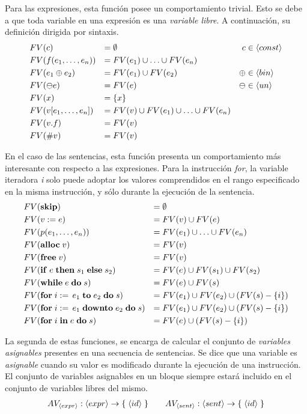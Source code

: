 \documentclass{article}
\begin{document}
Para las expresiones, esta función posee un comportamiento trivial.
Esto se debe a que toda variable en una expresión es una \textit{variable libre}.
A continuación, su definición dirigida por sintaxis.
\begin{align*}
&FV(c)
&=&\;
\emptyset
&c &\in \langle const \rangle
\\
&FV(f(e_1, \ldots, e_n))
&=&\;
FV(e_1) \cup \ldots \cup FV(e_n)
\\
&FV(e_1 \oplus e_2)
&=&\;
FV(e_1) \cup FV(e_2)
&\oplus &\in \langle bin \rangle
\\
&FV(\ominus e)
&=&\;
FV(e)
&\ominus &\in \langle un \rangle
\\
&FV(x)
&=&\;
\{ x \}
\\
&FV(v [e_1, \ldots, e_n])
&=&\;
FV(v) \cup FV(e_1) \cup \ldots \cup FV(e_n)
\\
&FV(v.f)
&=&\;
FV(v)
\\
&FV(\# v)
&=&\;
FV(v)
\end{align*}

En el caso de las sentencias, esta función presenta un comportamiento más interesante con respecto a las expresiones.
Para la instrucción \textit{for}, la variable iteradora \textit{i} solo puede adoptar los valores comprendidos en el rango especificado en la misma instrucción, y sólo durante la ejecución de la sentencia.
\begin{align*}
&FV(\mathbf{skip})
&=&\;
\emptyset
\\
&FV(v := e)
&=&\;
FV(v) \cup FV(e)
\\
&FV(p(e_1, \ldots, e_n))
&=&\;
FV(e_1) \cup \ldots \cup FV(e_n)
\\
&FV(\mathbf{alloc} \; v)
&=&\;
FV(v)
\\
&FV(\mathbf{free} \; v)
&=&\;
FV(v)
\\
&FV(\mathbf{if} \; e \; \mathbf{then} \; s_1 \; \mathbf{else} \; s_2)
&=&\;
FV(e) \cup FV(s_1) \cup FV(s_2)
\\
&FV(\mathbf{while} \; e \; \mathbf{do} \; s)
&=&\;
FV(e) \cup FV(s)
\\
&FV(\mathbf{for} \; i := \, e_1 \; \mathbf{to} \; e_2 \; \mathbf{do} \; s)
&=&\;
FV(e_1) \cup FV(e_2) \cup (FV(s) - \{ i \})
\\
&FV(\mathbf{for} \; i := \, e_1 \; \mathbf{downto} \; e_2 \; \mathbf{do} \; s)
&=&\;
FV(e_1) \cup FV(e_2) \cup (FV(s) - \{ i \})
\\
&FV(\mathbf{for} \; i \; \mathbf{in} \; e \; \mathbf{do} \; s)
&=&\;
FV(e) \cup (FV(s) - \{ i \})
\end{align*}

La segunda de estas funciones, se encarga de calcular el conjunto de \textit{variables asignables} presentes en una secuencia de sentencias.
Se dice que una variable es \textit{asignable} cuando su valor es modificado durante la ejecución de una instrucción.
El conjunto de variables asignables en un bloque siempre estará incluido en el conjunto de variables libres del mismo.
\begin{gather*}
AV_{\langle expr \rangle}: \langle expr \rangle \rightarrow \{ \; \langle id \rangle \; \}
\qquad
AV_{\langle sent \rangle}: \langle sent \rangle \rightarrow \{ \; \langle id \rangle \; \}
\end{gather*}
\end{document}
